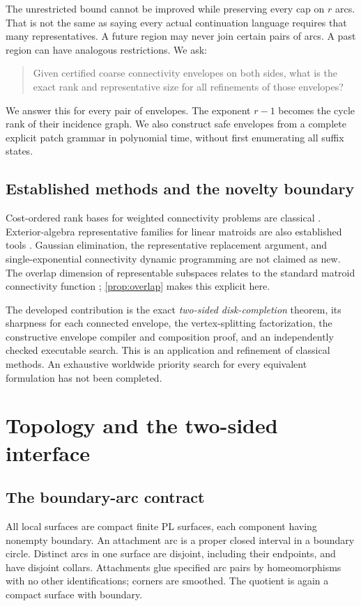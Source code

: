 \documentclass[11pt,a4paper]{article}
\theoremstyle{definition}
\theoremstyle{remark}
\begin{document}
The unrestricted bound cannot be improved while preserving every cap on $r$ arcs.
That is not the same as saying every actual continuation language requires that many
representatives. A future region may never join certain pairs of arcs. A past region can
have analogous restrictions. We ask:
\begin{quote}
Given certified coarse connectivity envelopes on both sides, what is the exact rank and
representative size for all refinements of those envelopes?
\end{quote}
We answer this for every pair of envelopes. The exponent $r-1$ becomes the cycle rank
of their incidence graph. We also construct safe envelopes from a complete explicit patch
grammar in polynomial time, without first enumerating all suffix states.

\subsection{Established methods and the novelty boundary}
Cost-ordered rank bases for weighted connectivity problems are classical \cite{bckn}.
Exterior-algebra representative families for linear matroids are also established tools
\cite{flps}. Gaussian elimination, the representative replacement argument, and
single-exponential connectivity dynamic programming are not claimed as new.
The overlap dimension of representable subspaces relates to the standard matroid
connectivity function \cite{seymour}; \cref{prop:overlap} makes this explicit here.

The developed contribution is the exact \emph{two-sided disk-completion} theorem, its
sharpness for each connected envelope, the vertex-splitting factorization, the constructive
envelope compiler and composition proof, and an independently checked executable search.
This is an application and refinement of classical methods. An exhaustive worldwide
priority search for every equivalent formulation has not been completed.

\section{Topology and the two-sided interface}\label{sec:topology}
\subsection{The boundary-arc contract}
All local surfaces are compact finite PL surfaces, each component having nonempty boundary.
An attachment arc is a proper closed interval in a boundary circle. Distinct arcs in one
surface are disjoint, including their endpoints, and have disjoint collars. Attachments
glue specified arc pairs by homeomorphisms with no other identifications; corners are
smoothed. The quotient is again a compact surface with boundary.
\end{document}
